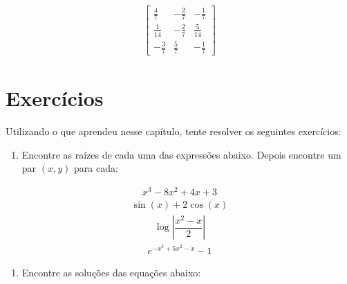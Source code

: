 \documentclass[letterpaper,10pt,english]{jupyterBook}
\begin{document}
\begin{sphinxVerbatim}[commandchars=\\\{\}]
\end{sphinxVerbatim}
\begin{equation*}
\begin{split}\displaystyle \left[\begin{matrix}\frac{4}{7} & - \frac{2}{7} & - \frac{1}{7}\\\frac{1}{14} & - \frac{2}{7} & \frac{5}{14}\\- \frac{3}{7} & \frac{5}{7} & - \frac{1}{7}\end{matrix}\right]\end{split}
\end{equation*}

\section{Exercícios}
\label{\detokenize{chapters/3:exercicios}}
\sphinxAtStartPar
Utilizando o que aprendeu nesse capítulo, tente resolver os seguintes exercícios:
\begin{enumerate}
%
\item {} 
\sphinxAtStartPar
Encontre as raízes de cada uma das expressões abaixo. Depois encontre um par \((x,y)\) para cada:

\end{enumerate}
\begin{equation*}
\begin{split}x^3 - 8x^2 + 4x + 3 \end{split}
\end{equation*}\begin{equation*}
\begin{split}\sin(x) + 2\cos(x)\end{split}
\end{equation*}\begin{equation*}
\begin{split}\log\left|\dfrac{x^2 - x}{2}\right|\end{split}
\end{equation*}\begin{equation*}
\begin{split}e^{-x^3 + 5x^2 -x} -1\end{split}
\end{equation*}\begin{enumerate}
%
\item {} 
\sphinxAtStartPar
Encontre as soluções das equações abaixo:

\end{enumerate}
\end{document}
